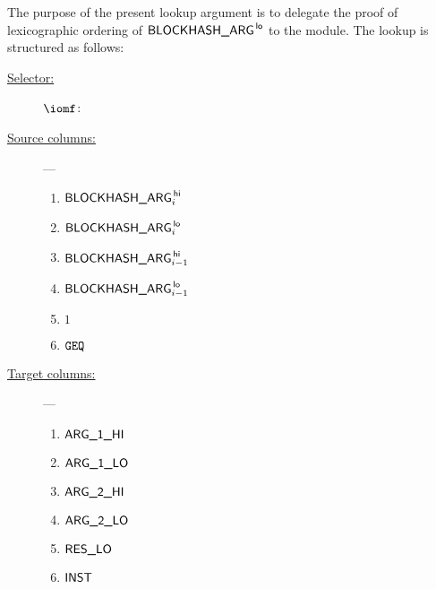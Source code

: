 The purpose of the present lookup argument is to delegate the proof of lexicographic ordering of $\textsf{BLOCKHASH\_ARG}^{\mathsf{\,lo}}$ to the \wcpMod{} module.
The lookup is structured as follows:
\begin{description}
	\item[\underline{Selector:}] $\iomf$:
	\item[\underline{Source columns:}] ---
		\begin{multicols}{3}
			\begin{enumerate}
				\item $\textsf{BLOCKHASH\_ARG}^{\mathsf{\,hi}}_{i}$
				\item $\textsf{BLOCKHASH\_ARG}^{\mathsf{\,lo}}_{i}$
				\item $\textsf{BLOCKHASH\_ARG}^{\mathsf{\,hi}}_{i-1}$
				\item $\textsf{BLOCKHASH\_ARG}^{\mathsf{\,lo}}_{i-1}$
				\item $1$
				\item $\texttt{GEQ}$
			\end{enumerate}
		\end{multicols}
	\item[\underline{Target columns:}] ---
		\begin{multicols}{3}
		\begin{enumerate}
			\item $\textsf{ARG}\textsf{\_1}\textsf{\_HI}$
			\item $\textsf{ARG}\textsf{\_1}\textsf{\_LO}$
			\item $\textsf{ARG}\textsf{\_2}\textsf{\_HI}$
			\item $\textsf{ARG}\textsf{\_2}\textsf{\_LO}$
			\item $\textsf{RES}\textsf{\_LO}$
			\item $\textsf{INST}$
		\end{enumerate}
		\end{multicols}
\end{description}
